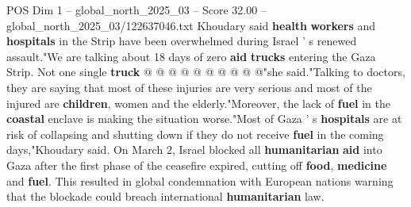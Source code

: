 \begin{textsample}{POS Dim 1 – global\_north\_2025\_03 – Score 32.00 – global\_north\_2025\_03/122637046.txt}
Khoudary said \textbf{health} \textbf{workers} and \textbf{hospitals} in the Strip have been overwhelmed during Israel ' s renewed assault."We are talking about 18 days of zero \textbf{aid} \textbf{trucks} entering the Gaza Strip.
Not one single \textbf{truck} @ @ @ @ @ @ @ @ @ @"she said."Talking to doctors, they are saying that most of these injuries are very serious and most of the injured are \textbf{children}, women and the elderly."Moreover, the lack of \textbf{fuel} in the \textbf{coastal} enclave is making the situation worse."Most of Gaza ' s \textbf{hospitals} are at risk of collapsing and shutting down if they do not receive \textbf{fuel} in the coming days,"Khoudary said.
On March 2, Israel blocked all \textbf{humanitarian} \textbf{aid} into Gaza after the first phase of the ceasefire expired, cutting off \textbf{food}, \textbf{medicine} and \textbf{fuel}.
This resulted in global condemnation with European nations warning that the blockade could breach international \textbf{humanitarian} law.

\end{textsample}
